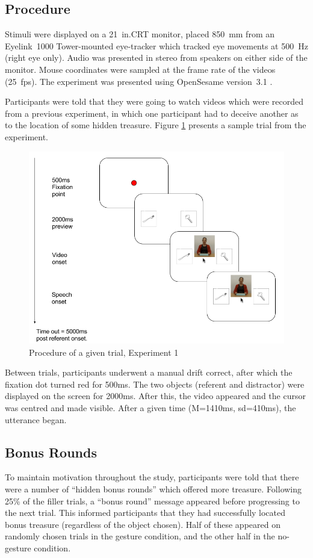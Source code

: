\documentclass[a4paper,man,natbib]{apa6}
\begin{document}
\subsection{Procedure}
Stimuli were displayed on a 21~in.\@ CRT monitor, placed 850~mm from an Eyelink~1000 Tower-mounted eye-tracker which tracked eye movements at 500~Hz (right eye only). 
Audio was presented in stereo from speakers on either side of the monitor. 
Mouse coordinates were sampled at the frame rate of the videos (25~fps). 
The experiment was presented using OpenSesame version~3.1 \citep{Mathot2012}.

Participants were told that they were going to watch videos which were recorded from a previous experiment, in which one participant had to deceive another as to the location of some hidden treasure. 
Figure \ref{fig:v1_trial} presents a sample trial from the experiment. 
\begin{figure}[Ht]
  \centering
	\includegraphics[width=\linewidth]{./img/e7_trial.png}
  \caption{Procedure of a given trial, Experiment 1}
  \label{fig:v1_trial}
\end{figure}
Between trials, participants underwent a manual drift correct, after which the fixation dot turned red for 500ms. 
The two objects (referent and distractor) were displayed on the screen for 2000ms.
After this, the video appeared and the cursor was centred and made visible.
After a given time (M=1410ms, sd=410ms), the utterance began. 

\subsection{Bonus Rounds}
To maintain motivation throughout the study, participants were told that there were a number of ``hidden bonus rounds'' which offered more treasure. 
Following 25\% of the filler trials, a ``bonus round'' message appeared before progressing to the next trial.
This informed participants that they had successfully located bonus treasure (regardless of the object chosen).
Half of these appeared on randomly chosen trials in the gesture condition, and the other half in the no-gesture condition.
\end{document}

